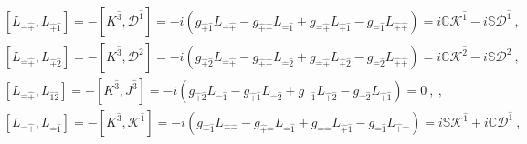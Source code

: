 \documentclass[12pt,a4paper]{report}
\begin{document}
\begin{align*}
    &\left[L_{\hat{-}\hat{+}},L_{\hat{+}\hat{1}}\right]=-\left[K^{\hat{3}},\mathcal{D}^\hat{1}\right]=-i\left(g_{\hat{+}\hat{1}}L_{\hat{-}\hat{+}}-g_{\hat{+}\hat{+}}L_{\hat{-}\hat{1}}+g_{\hat{-}\hat{+}}L_{\hat{+}\hat{1}}-g_{\hat{-}\hat{1}}L_{\hat{+}\hat{+}}\right)=i\mathbb{C}\mathcal{K}^{\hat{1}}-i\mathbb{S}\mathcal{D}^{\hat{1}}~,\\
    &\left[L_{\hat{-}\hat{+}},L_{\hat{+}\hat{2}}\right]=-\left[K^{\hat{3}},\mathcal{D}^\hat{2}\right]=-i\left(g_{\hat{+}\hat{2}}L_{\hat{-}\hat{+}}-g_{\hat{+}\hat{+}}L_{\hat{-}\hat{2}}+g_{\hat{-}\hat{+}}L_{\hat{+}\hat{2}}-g_{\hat{-}\hat{2}}L_{\hat{+}\hat{+}}\right)=i\mathbb{C}\mathcal{K}^{\hat{2}}-i\mathbb{S}\mathcal{D}^{\hat{2}}~,\\
    &\left[L_{\hat{-}\hat{+}},L_{\hat{1}\hat{2}}\right]=-\left[K^{\hat{3}},J^{\hat{3}}\right]=-i\left(g_{\hat{+}\hat{2}}L_{\hat{-}\hat{1}}-g_{\hat{+}\hat{1}}L_{\hat{-}\hat{2}}+g_{\hat{-}\hat{1}}L_{\hat{+}\hat{2}}-g_{\hat{-}\hat{2}}L_{\hat{+}\hat{1}}\right)=0~,~,\\
    &\left[L_{\hat{-}\hat{+}},L_{\hat{-}\hat{1}}\right]=-\left[K^{\hat{3}},\mathcal{K}^{\hat{1}}\right]=-i\left(g_{\hat{+}\hat{1}}L_{\hat{-}\hat{-}}-g_{\hat{+}\hat{-}}L_{\hat{-}\hat{1}}+g_{\hat{-}\hat{-}}L_{\hat{+}\hat{1}}-g_{\hat{-}\hat{1}}L_{\hat{+}\hat{-}}\right)=i\mathbb{S}\mathcal{K}^{\hat{1}}+i\mathbb{C}\mathcal{D}^{\hat{1}}~,
    \end{align*}
\end{document}
